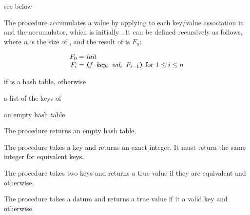 \begin{procedure}
\end{procedure}
\returns{} see below

The  procedure accumulates a value by applying 
to each key/value association in  and the accumulator, which
is initially . It can be defined recursively as follows,
where $n$ is the size of , and the result of 
is $F_n$:

$$\begin{array}{r@{\;=\;}l}
F_0 & \var{init}\\
F_i & \code{(\var{f} \var{key$_i$} \var{val$_i$} $F_{i-1}$)}
\hbox{ for $1 \le i \le n$}\\
\end{array}$$

\begin{procedure}
\end{procedure}
\returns{}  if  is a hash table, 
otherwise

\begin{procedure}
\end{procedure}
\returns{} a list of the keys of 

\begin{procedure}
\end{procedure}
\returns{} an empty hash table

The  procedure returns an empty hash table.

The  procedure takes a key and returns an exact
integer. It must return the same integer for equivalent keys.

The  procedure takes two keys and returns a true value
if they are equivalent and  otherwise.

The  procedure takes a datum and returns a true value
if it a valid key and  otherwise.

